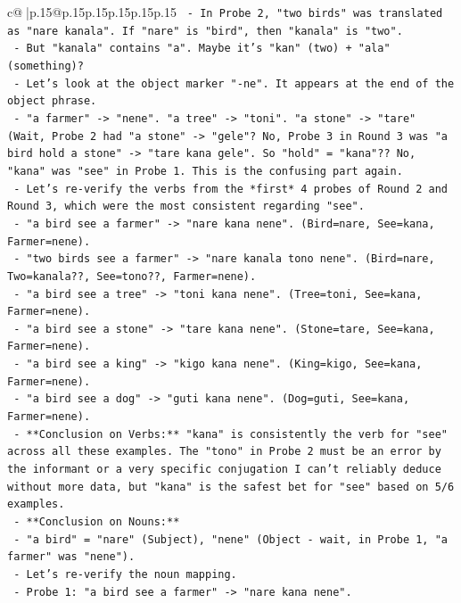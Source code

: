\documentclass{article}
\begin{document}
{\begin{supertabular}{c@{$\;$}|p{.15\linewidth}@{}p{.15\linewidth}p{.15\linewidth}p{.15\linewidth}p{.15\linewidth}p{.15\linewidth}}
{{{\texttt{    {-} In Probe 2, "two birds" was translated as "nare kanala". If "nare" is "bird", then "kanala" is "two".} \\
\texttt{    {-} But "kanala" contains "a". Maybe it's "kan" (two) + "ala" (something)?} \\
\texttt{    {-} Let's look at the object marker "{-}ne". It appears at the end of the object phrase.} \\
\texttt{    {-} "a farmer" {-}> "nene". "a tree" {-}> "toni". "a stone" {-}> "tare" (Wait, Probe 2 had "a stone" {-}> "gele"? No, Probe 3 in Round 3 was "a bird hold a stone" {-}> "tare kana gele". So "hold" = "kana"?? No, "kana" was "see" in Probe 1. This is the confusing part again.} \\
\texttt{    {-} Let's re{-}verify the verbs from the *first* 4 probes of Round 2 and Round 3, which were the most consistent regarding "see".} \\
\texttt{      {-} "a bird see a farmer" {-}> "nare kana nene". (Bird=nare, See=kana, Farmer=nene).} \\
\texttt{      {-} "two birds see a farmer" {-}> "nare kanala tono nene". (Bird=nare, Two=kanala??, See=tono??, Farmer=nene).} \\
\texttt{      {-} "a bird see a tree" {-}> "toni kana nene". (Tree=toni, See=kana, Farmer=nene).} \\
\texttt{      {-} "a bird see a stone" {-}> "tare kana nene". (Stone=tare, See=kana, Farmer=nene).} \\
\texttt{      {-} "a bird see a king" {-}> "kigo kana nene". (King=kigo, See=kana, Farmer=nene).} \\
\texttt{      {-} "a bird see a dog" {-}> "guti kana nene". (Dog=guti, See=kana, Farmer=nene).} \\
\texttt{    {-} **Conclusion on Verbs:** "kana" is consistently the verb for "see" across all these examples. The "tono" in Probe 2 must be an error by the informant or a very specific conjugation I can't reliably deduce without more data, but "kana" is the safest bet for "see" based on 5/6 examples.} \\
\texttt{    {-} **Conclusion on Nouns:**} \\
\texttt{      {-} "a bird" = "nare" (Subject), "nene" (Object {-} wait, in Probe 1, "a farmer" was "nene").} \\
\texttt{      {-} Let's re{-}verify the noun mapping.} \\
\texttt{      {-} Probe 1: "a bird see a farmer" {-}> "nare kana nene".} \\
}}}
\end{supertabular}}
\end{document}
